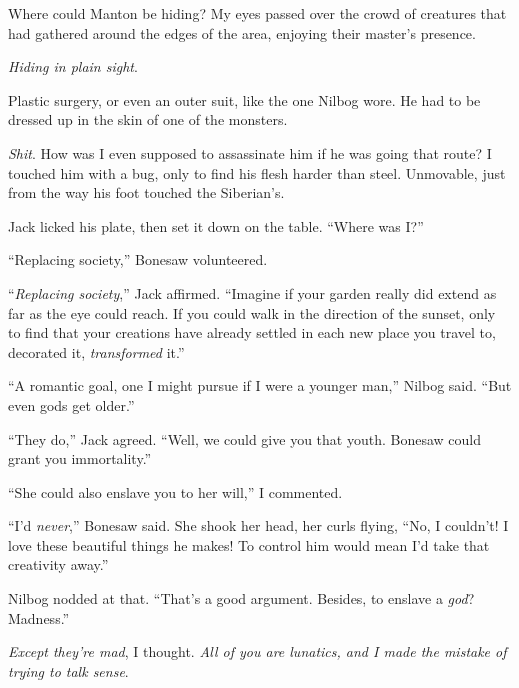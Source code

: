 Where could Manton be hiding?  My eyes passed over the crowd of creatures that had gathered around the edges of the area, enjoying their master's presence.



\emph{Hiding in plain sight}.



Plastic surgery, or even an outer suit, like the one Nilbog wore.  He had to be dressed up in the skin of one of the monsters.



\emph{Shit}.  How was I even supposed to assassinate him if he was going that route?  I touched him with a bug, only to find his flesh harder than steel.  Unmovable, just from the way his foot touched the Siberian's.



Jack licked his plate, then set it down on the table.  ``Where was I?''



``Replacing society,'' Bonesaw volunteered.



``\emph{Replacing society},'' Jack affirmed.  ``Imagine if your garden really did extend as far as the eye could reach.  If you could walk in the direction of the sunset, only to find that your creations have already settled in each new place you travel to, decorated it, \emph{transformed} it.''



``A romantic goal, one I might pursue if I were a younger man,'' Nilbog said.  ``But even gods get older.''



``They do,'' Jack agreed.  ``Well, we could give you that youth.  Bonesaw could grant you immortality.''



``She could also enslave you to her will,'' I commented.



``I'd \emph{never},'' Bonesaw said.  She shook her head, her curls flying, ``No, I couldn't!  I love these beautiful things he makes!  To control him would mean I'd take that creativity away.''



Nilbog nodded at that.  ``That's a good argument.  Besides, to enslave a \emph{god}?  Madness.''



\emph{Except they're mad}, I thought.  \emph{All of you are lunatics, and I made the mistake of trying to talk sense}.



